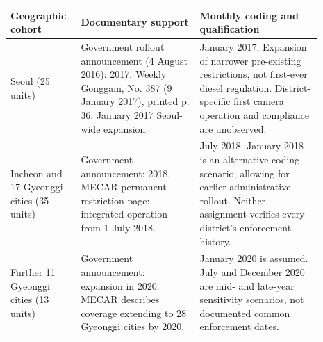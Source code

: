 \begin{tabular}{p{0.18\linewidth}p{0.35\linewidth}p{0.36\linewidth}}
\toprule
Geographic cohort & Documentary support & Monthly coding and qualification \\
\midrule
Seoul (25 units) & Government rollout announcement (4 August 2016): 2017. Weekly Gonggam, No. 387 (9 January 2017), printed p. 36: January 2017 Seoul-wide expansion. & January 2017. Expansion of narrower pre-existing restrictions, not first-ever diesel regulation. District-specific first camera operation and compliance are unobserved. \\
Incheon and 17 Gyeonggi cities (35 units) & Government announcement: 2018. MECAR permanent-restriction page: integrated operation from 1 July 2018. & July 2018. January 2018 is an alternative coding scenario, allowing for earlier administrative rollout. Neither assignment verifies every district's enforcement history. \\
Further 11 Gyeonggi cities (13 units) & Government announcement: expansion in 2020. MECAR describes coverage extending to 28 Gyeonggi cities by 2020. & January 2020 is assumed. July and December 2020 are mid- and late-year sensitivity scenarios, not documented common enforcement dates. \\
\bottomrule
\end{tabular}
